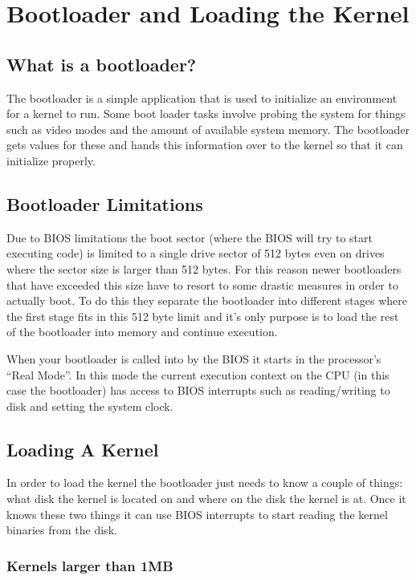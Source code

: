 \chapter{Bootloader and Loading the Kernel}

\section{What is a bootloader?}

The bootloader is a simple application that is used to initialize an environment
for a kernel to run. Some boot loader tasks involve probing the system for
things such as video modes and the amount of available system memory. The
bootloader gets values for these and hands this information over to the kernel
so that it can initialize properly.

\section{Bootloader Limitations}

Due to BIOS limitations the boot sector (where the BIOS will try to start
executing code) is limited to a single drive sector of 512 bytes even on drives
where the sector size is larger than 512 bytes. For this reason newer
bootloaders that have exceeded this size have to resort to some drastic measures
in order to actually boot. To do this they separate the bootloader into
different stages where the first stage fits in this 512 byte limit and it's only
purpose is to load the rest of the bootloader into memory and continue
execution.

When your bootloader is called into by the BIOS it starts in the processor's
``Real Mode''. In this mode the current execution context on the CPU (in this
case the bootloader) has access to BIOS interrupts such as reading/writing to
disk and setting the system clock.

\section{Loading A Kernel}

In order to load the kernel the bootloader just needs to know a couple of
things: what disk the kernel is located on and where on the disk the kernel is
at. Once it knows these two things it can use BIOS interrupts to start reading
the kernel binaries from the disk.

\subsection{Kernels larger than 1MB}

